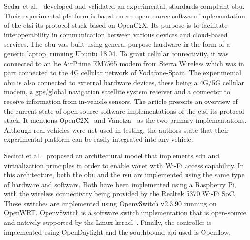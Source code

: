 	
Sedar et al.~\cite{sedar_standards-compliant_2021} developed and validated an experimental, standards-compliant \gls{obu}. Their experimental platform is based on an open-source software implementation of the \gls{etsi} \gls{its} protocol stack based on OpenC2X. Its purpose is to facilitate interoperability in communication between various devices and cloud-based services.
The \gls{obu} was built using general purpose hardware in the form of a generic laptop, running Ubuntu 18.04. To grant cellular connectivity, it was connected to an \gls{lte} AirPrime EM7565 modem from Sierra Wireless which was in part connected to the 4G cellular network of Vodafone-Spain. The experimental \gls{obu} is also connected to external hardware devices, these being a 4G/5G cellular modem, a \gls{gps}/global navigation satellite system receiver and a connector to receive information from in-vehicle sensors.
The article presents an overview of the current state of open-source software implementations of the \gls{etsi} \gls{its} protocol stack. It mentions OpenC2X~\cite{laux_demo_2016} and Vanetza~\cite{noauthor_vanetza_nodate} as the two primary implementations. 
Although real vehicles were not used in testing, the authors state that their experimental platform can be easily integrated into any vehicle.


Secinti et al.~\cite{secinti_software_2017} proposed an architectural model that implements \gls{sdn} and virtualization principles in order to enable \gls{vanet} with Wi-Fi access capability. 
In this architecture, both the \gls{obu} and the \gls{rsu} are implemented using the same type of hardware and software. Both have been implemented using a Raspberry Pi, with the wireless connectivity being provided by the Realtek 5370 Wi-Fi SoC.
These switches are implemented using OpenvSwitch v2.3.90 running on OpenWRT. OpenvSwitch is a software switch implementation that is open-source and natively supported by the Linux kernel~\cite{noauthor_open_nodate-2}. Finally, the controller is implemented using OpenDaylight and the southbound \gls{api} used is Openflow.


